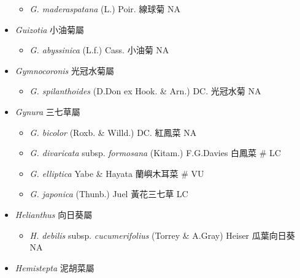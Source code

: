 \begin{itemize}
  \begin{itemize}
        \item[] \textit{G. maderaspatana} (L.) Poir.  線球菊   NA
  \end{itemize}
 \item[] \textit{Guizotia} 小油菊屬
                                
  \begin{itemize}
        \item[] \textit{G. abyssinica} (L.f.) Cass.  小油菊   NA
  \end{itemize}
 \item[] \textit{Gymnocoronis} 光冠水菊屬
                                
  \begin{itemize}
        \item[] \textit{G. spilanthoides} (D.Don ex Hook. \& Arn.) DC.  光冠水菊   NA
  \end{itemize}
 \item[] \textit{Gynura} 三七草屬
                                
  \begin{itemize}
        \item[] \textit{G. bicolor} (Roxb. \& Willd.) DC.  紅鳳菜   NA
        \item[] \textit{G. divaricata} subsp. \textit{formosana} (Kitam.) F.G.Davies  白鳳菜  \# LC
        \item[] \textit{G. elliptica} Yabe \& Hayata  蘭嶼木耳菜  \# VU
        \item[] \textit{G. japonica} (Thunb.) Juel  黃花三七草   LC
  \end{itemize}
 \item[] \textit{Helianthus} 向日葵屬
                                
  \begin{itemize}
        \item[] \textit{H. debilis} subsp. \textit{cucumerifolius} (Torrey \& A.Gray) Heiser  瓜葉向日葵   NA
  \end{itemize}
 \item[] \textit{Hemistepta} 泥胡菜屬
                                

\end{itemize}
